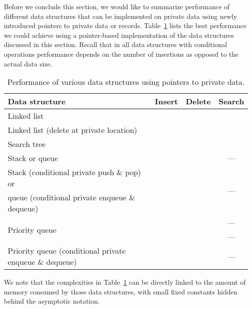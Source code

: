 \documentclass[11pt]{article}
\begin{document}
Before we conclude this section, we would like to summarize performance of
different data structures that can be implemented on private data using
newly introduced pointers to private data or records.
Table~\ref{tab:data-structures} lists the best performance we could achieve
using a pointer-based implementation of the data structures discussed in
this section. Recall that in all data structures with conditional operations
performance depends on the number of insertions as opposed to the actual
data size.
\begin{table} \small \centering 
\begin{tabular}{|l|c|c|c|} \hline
\hfil Data structure & Insert & Delete & Search \\ \hline
Linked list &  &  &  \\ \hline
Linked list (delete at private location) &  &  &  \\ \hline
Search tree &  &  &  \\ \hline
Stack or queue &  &  & --- \\ \hline
Stack (conditional private push \& pop) or & \multirow{2}{*}{} &
\multirow{2}{*}{} & \multirow{2}{*}{---} \\ 
queue (conditional private enqueue \& dequeue) & & & \\ \hline
\multirow{2}{*}{Priority queue} &  &  & --- \\
\cline{2-4}
&  &  & --- \\ \hline
Priority queue (conditional private enqueue \& dequeue) &  &  & --- \\ \hline
\end{tabular}
\caption{Performance of various data structures using pointers to
  private data.} \label{tab:data-structures}
\end{table}
We note that the complexities in Table~\ref{tab:data-structures} can be
directly linked to the amount of memory consumed by those data structures,
with small fixed constants hidden behind the asymptotic notation.
\end{document}
